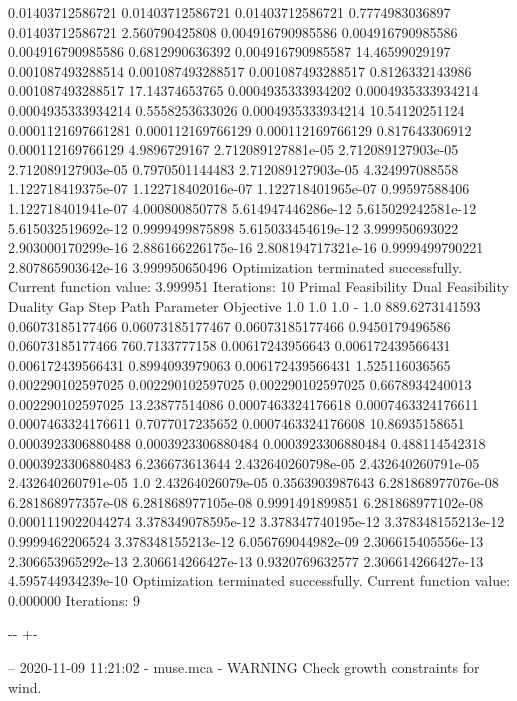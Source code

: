 \documentclass[letterpaper,10pt,english]{sphinxmanual}
\newlength\nbsphinxcodecellspacing
\begin{document}
{\begin{sphinxVerbatim}[commandchars=\\\{\}]
0.01403712586721    0.01403712586721    0.01403712586721    0.7774983036897  0.01403712586721    2.560790425808
0.004916790985586   0.004916790985586   0.004916790985586   0.6812990636392  0.004916790985587   14.46599029197
0.001087493288514   0.001087493288517   0.001087493288517   0.8126332143986  0.001087493288517   17.14374653765
0.0004935333934202  0.0004935333934214  0.0004935333934214  0.5558253633026  0.0004935333934214  10.54120251124
0.0001121697661281  0.000112169766129   0.000112169766129   0.817643306912   0.000112169766129   4.9896729167
2.712089127881e-05  2.712089127903e-05  2.712089127903e-05  0.7970501144483  2.712089127903e-05  4.324997088558
1.122718419375e-07  1.122718402016e-07  1.122718401965e-07  0.99597588406    1.122718401941e-07  4.000800850778
5.614947446286e-12  5.615029242581e-12  5.615032519692e-12  0.9999499875898  5.615033454619e-12  3.999950693022
2.903000170299e-16  2.886166226175e-16  2.808194717321e-16  0.9999499790221  2.807865903642e-16  3.999950650496
Optimization terminated successfully.
         Current function value: 3.999951
         Iterations: 10
Primal Feasibility  Dual Feasibility    Duality Gap         Step             Path Parameter      Objective
1.0                 1.0                 1.0                 -                1.0                 889.6273141593
0.06073185177466    0.06073185177467    0.06073185177466    0.9450179496586  0.06073185177466    760.7133777158
0.00617243956643    0.006172439566431   0.006172439566431   0.8994093979063  0.006172439566431   1.525116036565
0.002290102597025   0.002290102597025   0.002290102597025   0.6678934240013  0.002290102597025   13.23877514086
0.0007463324176618  0.0007463324176611  0.0007463324176611  0.7077017235652  0.0007463324176608  10.86935158651
0.0003923306880488  0.0003923306880484  0.0003923306880484  0.488114542318   0.0003923306880483  6.236673613644
2.432640260798e-05  2.432640260791e-05  2.432640260791e-05  1.0              2.43264026079e-05   0.3563903987643
6.281868977076e-08  6.281868977357e-08  6.281868977105e-08  0.9991491899851  6.281868977102e-08  0.0001119022044274
3.378349078595e-12  3.378347740195e-12  3.378348155213e-12  0.9999462206524  3.378348155213e-12  6.056769044982e-09
2.306615405556e-13  2.306653965292e-13  2.306614266427e-13  0.9320769632577  2.306614266427e-13  4.595744934239e-10
Optimization terminated successfully.
         Current function value: 0.000000
         Iterations: 9
\end{sphinxVerbatim}
}

{

\kern-\sphinxverbatimsmallskipamount\kern-\baselineskip
\kern+\FrameHeightAdjust\kern-\fboxrule
\vspace{\nbsphinxcodecellspacing}

\begin{sphinxVerbatim}[commandchars=\\\{\}]
-- 2020-11-09 11:21:02 - muse.mca - WARNING
Check growth constraints for wind.

\end{sphinxVerbatim}
}
\end{document}
